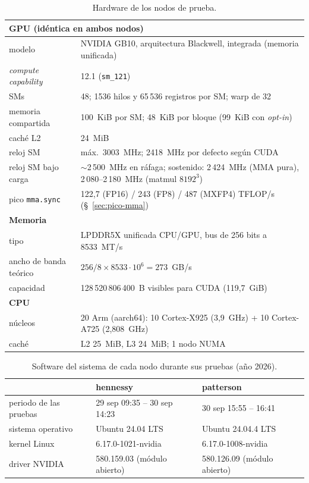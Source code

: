 \begin{table}[htbp]
  \centering\small
  \begin{tabularx}{\linewidth}{lX}
    \toprule
    \multicolumn{2}{l}{\textbf{GPU} (idéntica en ambos nodos)} \\
    \midrule
    modelo & NVIDIA GB10, arquitectura Blackwell, integrada (memoria unificada) \\
    \emph{compute capability} & 12.1 (\texttt{sm\_121}) \\
    SMs & 48; 1536 hilos y 65\,536 registros por SM; warp de 32 \\
    memoria compartida & 100~KiB por SM; 48~KiB por bloque (99~KiB con \emph{opt-in}) \\
    caché L2 & 24~MiB \\
    reloj SM & máx.\ 3003~MHz; 2418~MHz por defecto según CUDA \\
    reloj SM bajo carga & $\sim$2\,500~MHz en ráfaga; sostenido: 2\,424~MHz (MMA pura), 2\,080--2\,180~MHz (matmul $8192^3$) \\
    pico \texttt{mma.sync} & 122{,}7 (FP16) / 243 (FP8) / 487 (MXFP4) TFLOP/s (§~\ref{sec:pico-mma}) \\
    \midrule
    \multicolumn{2}{l}{\textbf{Memoria}} \\
    \midrule
    tipo & LPDDR5X unificada CPU/GPU, bus de 256 bits a 8533~MT/s \\
    ancho de banda teórico & $256/8 \times 8533\cdot 10^6 = 273$~GB/s \\
    capacidad & 128\,520\,806\,400~B visibles para CUDA (119,7~GiB) \\
    \midrule
    \multicolumn{2}{l}{\textbf{CPU}} \\
    \midrule
    núcleos & 20 Arm (aarch64): 10 Cortex-X925 (3,9~GHz) + 10 Cortex-A725 (2,808~GHz) \\
    caché & L2 25~MiB, L3 24~MiB; 1 nodo NUMA \\
    \bottomrule
  \end{tabularx}
  \caption{Hardware de los nodos de prueba.}
  \label{tab:hardware}
\end{table}

\begin{table}[htbp]
  \centering\small
  \begin{tabularx}{\linewidth}{lXX}
    \toprule
    & hennessy & patterson \\
    \midrule
    periodo de las pruebas & 29 sep 09:35 -- 30 sep 14:23 & 30 sep 15:55 -- 16:41 \\
    sistema operativo & Ubuntu 24.04 LTS & Ubuntu 24.04.4 LTS \\
    kernel Linux & 6.17.0-1021-nvidia & 6.17.0-1008-nvidia \\
    driver NVIDIA & 580.159.03 (módulo abierto) & 580.126.09 (módulo abierto) \\
    \bottomrule
  \end{tabularx}
  \caption{Software del sistema de cada nodo durante sus pruebas (año 2026).}
  \label{tab:sistema}
\end{table}

